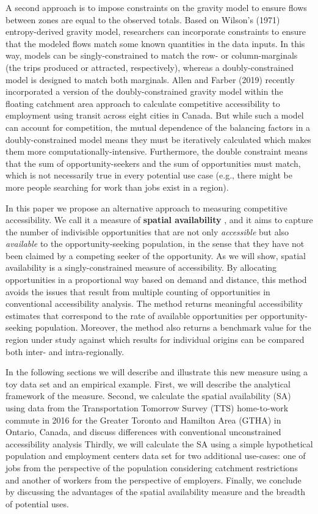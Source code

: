 \documentclass[]{elsarticle} %
\begin{document}
A second approach is to impose constraints on the gravity model to
ensure flows between zones are equal to the observed totals. Based on
Wilson's (1971) entropy-derived gravity model, researchers can
incorporate constraints to ensure that the modeled flows match some
known quantities in the data inputs. In this way, models can be
singly-constrained to match the row- or column-marginals (the trips
produced or attracted, respectively), whereas a doubly-constrained model
is designed to match both marginals. Allen and Farber (2019) recently
incorporated a version of the doubly-constrained gravity model within
the floating catchment area approach to calculate competitive
accessibility to employment using transit across eight cities in Canada.
But while such a model can account for competition, the mutual
dependence of the balancing factors in a doubly-constrained model means
they must be iteratively calculated which makes them more
computationally-intensive. Furthermore, the double constraint means that
the sum of opportunity-seekers and the sum of opportunities must match,
which is not necessarily true in every potential use case (e.g., there
might be more people searching for work than jobs exist in a region).

In this paper we propose an alternative approach to measuring
competitive accessibility. We call it a measure of \textbf{spatial
availability} , and it aims to capture the number of indivisible
opportunities that are not only \emph{accessible} but also
\emph{available} to the opportunity-seeking population, in the sense
that they have not been claimed by a competing seeker of the
opportunity. As we will show, spatial availability is a
singly-constrained measure of accessibility. By allocating opportunities
in a proportional way based on demand and distance, this method avoids
the issues that result from multiple counting of opportunities in
conventional accessibility analysis. The method returns meaningful
accessibility estimates that correspond to the rate of available
opportunities per opportunity-seeking population. Moreover, the method
also returns a benchmark value for the region under study against which
results for individual origins can be compared both inter- and
intra-regionally.

In the following sections we will describe and illustrate this new
measure using a toy data set and an empirical example. First, we will
describe the analytical framework of the measure. Second, we calculate
the spatial availability (SA) using data from the Transportation
Tomorrow Survey (TTS) home-to-work commute in 2016 for the Greater
Toronto and Hamilton Area (GTHA) in Ontario, Canada, and discuss
differences with conventional unconstrained accessibility analysis
Thirdly, we will calculate the SA using a simple hypothetical population
and employment centers data set for two additional use-cases: one of
jobs from the perspective of the population considering catchment
restrictions and another of workers from the perspective of employers.
Finally, we conclude by discussing the advantages of the spatial
availability measure and the breadth of potential uses.
\end{document}
